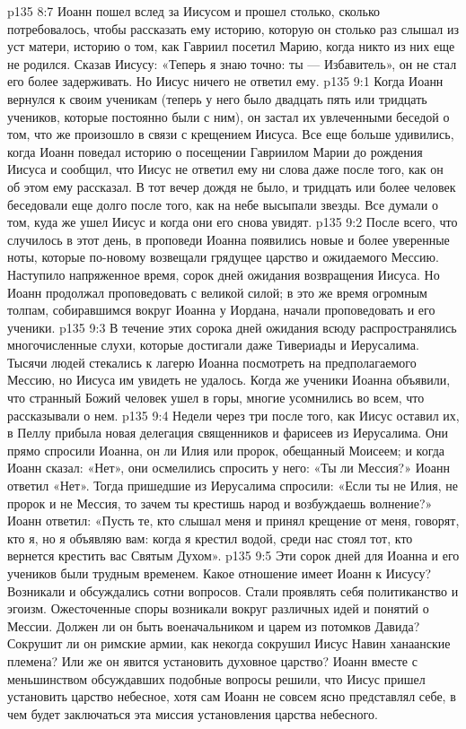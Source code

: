 \vs p135 8:7 Иоанн пошел вслед за Иисусом и прошел столько, сколько потребовалось, чтобы рассказать ему историю, которую он столько раз слышал из уст матери, историю о том, как Гавриил посетил Марию, когда никто из них еще не родился. Сказав Иисусу: «Теперь я знаю точно: ты --- Избавитель», он не стал его более задерживать. Но Иисус ничего не ответил ему.
\vs p135 9:1 Когда Иоанн вернулся к своим ученикам (теперь у него было двадцать пять или тридцать учеников, которые постоянно были с ним), он застал их увлеченными беседой о том, что же произошло в связи с крещением Иисуса. Все еще больше удивились, когда Иоанн поведал историю о посещении Гавриилом Марии до рождения Иисуса и сообщил, что Иисус не ответил ему ни слова даже после того, как он об этом ему рассказал. В тот вечер дождя не было, и тридцать или более человек беседовали еще долго после того, как на небе высыпали звезды. Все думали о том, куда же ушел Иисус и когда они его снова увидят.
\vs p135 9:2 \pc После всего, что случилось в этот день, в проповеди Иоанна появились новые и более уверенные ноты, которые по\hyp{}новому возвещали грядущее царство и ожидаемого Мессию. Наступило напряженное время, сорок дней ожидания возвращения Иисуса. Но Иоанн продолжал проповедовать с великой силой; в это же время огромным толпам, собиравшимся вокруг Иоанна у Иордана, начали проповедовать и его ученики.
\vs p135 9:3 В течение этих сорока дней ожидания всюду распространялись многочисленные слухи, которые достигали даже Тивериады и Иерусалима. Тысячи людей стекались к лагерю Иоанна посмотреть на предполагаемого Мессию, но Иисуса им увидеть не удалось. Когда же ученики Иоанна объявили, что странный Божий человек ушел в горы, многие усомнились во всем, что рассказывали о нем.
\vs p135 9:4 Недели через три после того, как Иисус оставил их, в Пеллу прибыла новая делегация священников и фарисеев из Иерусалима. Они прямо спросили Иоанна, он ли Илия или пророк, обещанный Моисеем; и когда Иоанн сказал: «Нет», они осмелились спросить у него: «Ты ли Мессия?» Иоанн ответил «Нет». Тогда пришедшие из Иерусалима спросили: «Если ты не Илия, не пророк и не Мессия, то зачем ты крестишь народ и возбуждаешь волнение?» Иоанн ответил: «Пусть те, кто слышал меня и принял крещение от меня, говорят, кто я, но я объявляю вам: когда я крестил водой, среди нас стоял тот, кто вернется крестить вас Святым Духом».
\vs p135 9:5 Эти сорок дней для Иоанна и его учеников были трудным временем. Какое отношение имеет Иоанн к Иисусу? Возникали и обсуждались сотни вопросов. Стали проявлять себя политиканство и эгоизм. Ожесточенные споры возникали вокруг различных идей и понятий о Мессии. Должен ли он быть военачальником и царем из потомков Давида? Сокрушит ли он римские армии, как некогда сокрушил Иисус Навин ханаанские племена? Или же он явится установить духовное царство? Иоанн вместе с меньшинством обсуждавших подобные вопросы решили, что Иисус пришел установить царство небесное, хотя сам Иоанн не совсем ясно представлял себе, в чем будет заключаться эта миссия установления царства небесного.
